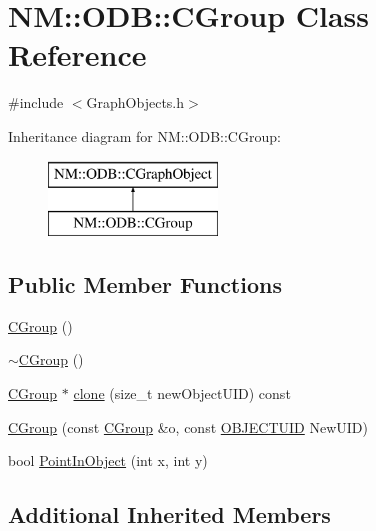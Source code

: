 \hypertarget{class_n_m_1_1_o_d_b_1_1_c_group}{}\section{N\+M\+:\+:O\+D\+B\+:\+:C\+Group Class Reference}
\label{class_n_m_1_1_o_d_b_1_1_c_group}


{\ttfamily \#include $<$Graph\+Objects.\+h$>$}

Inheritance diagram for N\+M\+:\+:O\+D\+B\+:\+:C\+Group\+:\begin{figure}[H]
\begin{center}
\leavevmode
\includegraphics[height=2.000000cm]{class_n_m_1_1_o_d_b_1_1_c_group}
\end{center}
\end{figure}
\subsection*{Public Member Functions}
\begin{DoxyCompactItemize}
\item 
\hyperlink{class_n_m_1_1_o_d_b_1_1_c_group_aba1babf005f4718e0917ea77ce0e2cda}{C\+Group} ()
\item 
\hyperlink{class_n_m_1_1_o_d_b_1_1_c_group_a585eabaa9c717d45b28f7011173c218c}{$\sim$\+C\+Group} ()
\item 
\hyperlink{class_n_m_1_1_o_d_b_1_1_c_group}{C\+Group} $\ast$ \hyperlink{class_n_m_1_1_o_d_b_1_1_c_group_a3e5d4ed073cad6a4ceb06cab70c84c21}{clone} (size\+\_\+t new\+Object\+U\+I\+D) const 
\item 
\hyperlink{class_n_m_1_1_o_d_b_1_1_c_group_a651346a5c17274a9b886ccfee4cb178a}{C\+Group} (const \hyperlink{class_n_m_1_1_o_d_b_1_1_c_group}{C\+Group} \&o, const \hyperlink{namespace_n_m_1_1_o_d_b_a262b64fab56baaa96e18bac4ada88265}{O\+B\+J\+E\+C\+T\+U\+I\+D} New\+U\+I\+D)
\item 
bool \hyperlink{class_n_m_1_1_o_d_b_1_1_c_group_adff338636685a3b3562b86fd0d23bebb}{Point\+In\+Object} (int x, int y)
\end{DoxyCompactItemize}
\subsection*{Additional Inherited Members}


